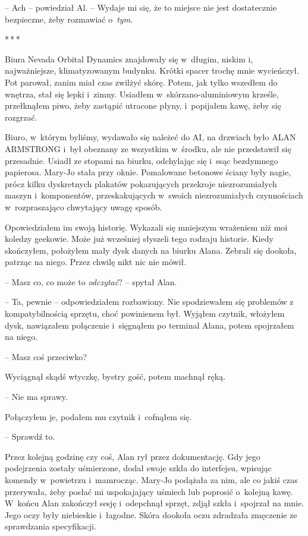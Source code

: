 \documentclass[oneside,polish,12pt,sfheadings]{mwbk}
\newcommand{\threeast}{\bigskip\par\centerline{*\,*\,*}\medskip\par}%
\begin{document}
-- Ach -- powiedział Al. -- Wydaje mi się, że to miejsce nie jest
dostatecznie bezpieczne, żeby rozmawiać o~\emph{tym}.

\threeast

Biura Nevada Orbital Dynamics znajdowały się w~długim, niskim i,
najważniejsze, klimatyzowanym budynku. Krótki spacer trochę mnie
wycieńczył. Pot parował, zanim miał czas zwilżyć skórę. Potem, jak tylko
wszedłem do wnętrza, stał się lepki i~zimny. Usiadłem w~skórzano-aluminiowym krześle, przełknąłem piwo, żeby zastąpić utracone
płyny, i~popijałem kawę, żeby się rozgrzać.

Biuro, w~którym byliśmy, wydawało się należeć do AI, na drzwiach było
ALAN ARMSTRONG i~był obeznany ze wszystkim w~środku, ale nie przedstawił
się przesadnie. Usiadł ze stopami na biurku, odchylając się i~ssąc
bezdymnego papierosa. Mary-Jo stała przy oknie. Pomalowane betonowe
ściany były nagie, prócz kilku dyskretnych plakatów pokazujących
przekroje niezrozumiałych maszyn i~komponentów, przeskakujących w~swoich
niezrozumiałych czynnościach w~rozpraszająco chwytający uwagę sposób.

Opowiedziałem im swoją historię. Wykazali się mniejszym wrażeniem niż
moi koledzy geekowie. Może już wcześniej słyszeli tego rodzaju historie.
Kiedy skończyłem, położyłem mały dysk danych na biurku Alana. Zebrali
się dookoła, patrząc na niego. Przez chwilę nikt nic nie mówił.

-- Masz co, co może to \emph{odczytać}? -- spytał Alan.

-- Ta, pewnie -- odpowiedziałem rozbawiony. Nie spodziewałem się problemów
z kompatybilnością sprzętu, choć powinienem był. Wyjąłem czytnik,
włożyłem dysk, nawiązałem połączenie i~sięgnąłem po terminal Alana,
potem spojrzałem na niego.

-- Masz coś przeciwko?

Wyciągnął skądś wtyczkę, bystry gość, potem machnął ręką.

-- Nie ma sprawy.

Połączyłem je, podałem mu czytnik i~cofnąłem się.

-- Sprawdź to.

Przez kolejną godzinę czy coś, Alan rył przez dokumentację. Gdy jego
podejrzenia zostały uśmierzone, dodał swoje szkła do interfejsu,
wpisując komendy w~powietrzu i~mamrocząc. Mary-Jo podążała za nim, ale
co jakiś czas przerywała, żeby posłać mi uspokajający uśmiech lub
poprosić o~kolejną kawę. W~końcu Alan zakończył sesję i~odepchnął
sprzęt, zdjął szkła i~spojrzał na mnie. Jego oczy były niebieskie i~łagodne. Skóra dookoła oczu zdradzała zmęczenie ze sprawdzania
specyfikacji.
\end{document}
